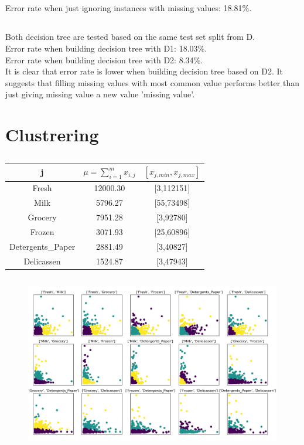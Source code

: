 \documentclass[12pt,a4paper]{report}
\begin{document}
	\subsection{}
  	Error rate when just ignoring instances with missing values: 18.81\%.
	\subsection{}
	Both decision tree are tested based on the same test set split from D.\\
  	Error rate when building decision tree with D1: 18.03\%.\\
  	Error rate when building decision tree with D2: 8.34\%.\\
  	It is clear that error rate is lower when building decision tree based on D2. It suggests that filling missing values with most common value performs better than just giving missing value a new value 'missing value'.
	\section{Clustrering}
	\subsection{}
	\begin{tabular}{|c|c|c|}
	\hline
	j&$\mu=\sum_{i=1}^{m}x_{i,j}$&$\left[x_{j,min},x_{j,max}\right]$\\
	\hline
	Fresh&12000.30&[3,112151]\\
	Milk&5796.27&[55,73498]\\
	Grocery&7951.28&[3,92780]\\
	Frozen&3071.93&[25,60896]\\
	Detergents\_Paper&2881.49&[3,40827]\\
	Delicassen&1524.87&[3,47943]\\
	\hline
	\end{tabular}

	\subsection{}
	\begin{figure}[htbp]
	\centering 
	\includegraphics[width=\textwidth]{kmeans_15.png} 
	\end{figure}
	
\end{document}
